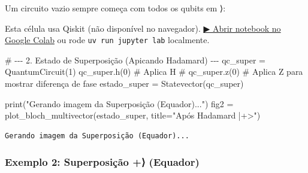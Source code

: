 \documentclass[
  brazilian,
]{report}
\newenvironment{Shaded}{\begin{snugshade}}{\end{snugshade}}
\newcommand{\BuiltInTok}[1]{\textcolor[rgb]{0.00,0.23,0.31}{#1}}
\newcommand{\CommentTok}[1]{\textcolor[rgb]{0.37,0.37,0.37}{#1}}
\newcommand{\DecValTok}[1]{\textcolor[rgb]{0.68,0.00,0.00}{#1}}
\newcommand{\NormalTok}[1]{\textcolor[rgb]{0.00,0.23,0.31}{#1}}
\newcommand{\OperatorTok}[1]{\textcolor[rgb]{0.37,0.37,0.37}{#1}}
\newcommand{\StringTok}[1]{\textcolor[rgb]{0.13,0.47,0.30}{#1}}
\begin{document}
Um circuito vazio sempre começa com todos os qubits em ⟩:

\begin{tcolorbox}[enhanced jigsaw, arc=.35mm, bottomrule=.15mm, bottomtitle=1mm, breakable, colback=white, colbacktitle=quarto-callout-warning-color!10!white, colframe=quarto-callout-warning-color-frame, coltitle=black, left=2mm, leftrule=.75mm, opacityback=0, opacitybacktitle=0.6, rightrule=.15mm, title=\textcolor{quarto-callout-warning-color}{\faExclamationTriangle}\hspace{0.5em}{⚛️ Célula Qiskit --- execute no Colab ou localmente}, titlerule=0mm, toprule=.15mm, toptitle=1mm]

Esta célula usa Qiskit (não disponível no navegador).
\href{https://colab.research.google.com/github/maxwellamaral/aula-quantum/blob/main/notebooks/01-intro.ipynb}{▶
Abrir notebook no Google Colab} ou rode \texttt{uv\ run\ jupyter\ lab}
localmente.

\begin{Shaded}
\begin{Highlighting}[]

\CommentTok{\# {-}{-}{-} 2. Estado de Superposição (Apicando Hadamard) {-}{-}{-}}
\NormalTok{qc\_super }\OperatorTok{=}\NormalTok{ QuantumCircuit(}\DecValTok{1}\NormalTok{)}
\NormalTok{qc\_super.h(}\DecValTok{0}\NormalTok{) }\CommentTok{\# Aplica H}
\CommentTok{\# qc\_super.z(0) \# Aplica Z para mostrar diferença de fase}
\NormalTok{estado\_super }\OperatorTok{=}\NormalTok{ Statevector(qc\_super)}

\BuiltInTok{print}\NormalTok{(}\StringTok{"Gerando imagem da Superposição (Equador)..."}\NormalTok{)}
\NormalTok{fig2 }\OperatorTok{=}\NormalTok{ plot\_bloch\_multivector(estado\_super, title}\OperatorTok{=}\StringTok{"Após Hadamard |+\textgreater{}"}\NormalTok{)}
\end{Highlighting}
\end{Shaded}

\end{tcolorbox}

\begin{verbatim}
Gerando imagem da Superposição (Equador)...
\end{verbatim}

\subsubsection{Exemplo 2: Superposição \textbar+⟩
(Equador)}\label{exemplo-2-superposiuxe7uxe3o-equador}
\end{document}
